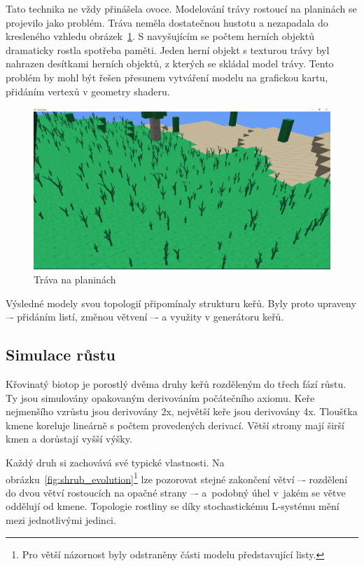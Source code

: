 \documentclass[thesis=M,czech]{FITthesis}[2019/12/23]
\begin{document}
Tato technika ne vždy přinášela ovoce. Modelování trávy rostoucí na planinách se projevilo jako problém. Tráva neměla dostatečnou hustotu a nezapadala do kresleného vzhledu obrázek~\ref{fig:grass_plains}. S navyšujícím se počtem herních objektů dramaticky rostla spotřeba paměti. Jeden herní objekt s texturou trávy byl nahrazen desítkami herních objektů, z kterých se skládal model trávy. Tento problém by mohl být řešen přesunem vytváření modelu na grafickou kartu, přidáním vertexů v geometry shaderu.

\begin{figure}\centering
	\includegraphics[width=\textwidth]{images/grass_plains}
	\caption[Tráva na planinách]{Tráva na planinách}\label{fig:grass_plains}
\end{figure}

Výsledné modely svou topologií připomínaly strukturu keřů. Byly proto upraveny –- přidáním listí, změnou větvení –- a využity v generátoru keřů.

\subsection{Simulace růstu}
Křovinatý biotop je porostlý dvěma druhy keřů rozděleným do třech fází růstu. Ty jsou simulovány opakovaným derivováním počátečního axiomu. Keře nejmenšího vzrůstu jsou derivovány 2x, největší keře jsou derivovány 4x. Tloušťka kmene koreluje lineárně s počtem provedených derivací. Větší stromy mají širší kmen a dorůstají vyšší výšky.

Každý druh si zachovává své typické vlastnosti. Na obrázku~\ref{fig:shrub_evolution}\footnote{Pro větší názornost byly odstraněny části modelu představující listy.}  lze pozorovat stejné zakončení větví –- rozdělení do dvou větví rostoucích na opačné strany –- a~podobný úhel v~jakém se větve oddělují od kmene. Topologie rostliny se díky stochastickému L-systému mění mezi jednotlivými jedinci.
\end{document}
